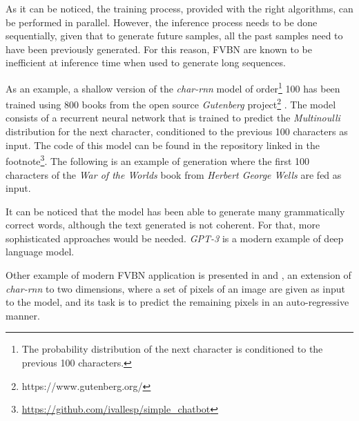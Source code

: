 As it can be noticed, the training process, provided with the right algorithms, can be performed in parallel. However, the inference process needs to be done sequentially, given that to generate future samples, all the past samples need to have been previously generated. For this reason, FVBN are known to be inefficient at inference time when used to generate long sequences.

As an example, a shallow version of the \textit{char-rnn} model of order\footnote{The probability distribution of the next character is conditioned to the previous 100 characters.} 100 has been trained using 800 books from the open source \textit{Gutenberg} project\footnote{https://www.gutenberg.org/} \autocite{gerlach2020}. The model consists of a recurrent neural network that is trained to predict the \textit{Multinoulli} distribution for the next character, conditioned to the previous 100 characters as input. The code of this model can be found in the repository linked in the footnote\footnote{\url{https://github.com/ivallesp/simple_chatbot}}. The following is an example of generation where the first 100 characters of the \textit{War of the Worlds} book from \textit{Herbert George Wells} are fed as input.


It can be noticed that the model has been able to generate many grammatically correct words, although the text generated is not coherent. For that, more sophisticated approaches would be needed. \textit{GPT-3} \autocite{floridi2020} is a modern example of deep language model.

Other example of modern FVBN application is presented in \citet{Oord2016} and \citet{Oord2016b}, an extension of \textit{char-rnn} to two dimensions, where a set of pixels of an image are given as input to the model, and its task is to predict the remaining pixels in an auto-regressive manner. 


